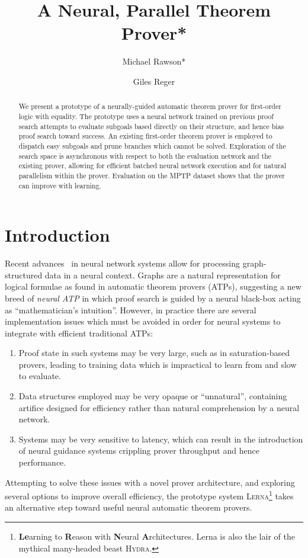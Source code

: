 \documentclass[runningheads]{llncs}
\newcommand{\lerna}{\textsc{Lerna}}
\begin{document}
\title{A Neural, Parallel Theorem Prover*}
\author{
	Michael Rawson* \and
	Giles Reger
}
\maketitle

\begin{abstract}
	We present a prototype of a neurally-guided automatic theorem prover for first-order logic with equality.
	The prototype uses a neural network trained on previous proof search attempts to evaluate subgoals based directly on their structure, and hence bias proof search toward success.
	An existing first-order theorem prover is employed to dispatch easy subgoals and prune branches which cannot be solved.
	Exploration of the search space is asynchronous with respect to both the evaluation network and the existing prover, allowing for efficient batched neural network execution and for natural parallelism within the prover.
	Evaluation on the MPTP dataset shows that the prover can improve with learning.
\end{abstract}

\section{Introduction}
Recent advances~ in neural network systems allow for processing graph-structured data in a neural context.
Graphs are a natural representation for logical formulae as found in automatic theorem provers (ATPs), suggesting a new breed of \emph{neural ATP} in which proof search is guided by a neural black-box acting as ``mathematician's intuition''.
However, in practice there are several implementation issues which must be avoided in order for neural systems to integrate with efficient traditional ATPs:
\begin{enumerate}
	\item Proof state in such systems may be very large, such as in saturation-based provers, leading to training data which is impractical to learn from and slow to evaluate.
	\item Data structures employed may be very opaque or ``unnatural'', containing artifice designed for efficiency rather than natural comprehension by a neural network.
	\item Systems may be very sensitive to latency, which can result in the introduction of neural guidance systems crippling prover throughput and hence performance.
\end{enumerate}
%
Attempting to solve these issues with a novel prover architecture, and exploring several options to improve overall efficiency, the prototype system \lerna{}\footnote{\textbf{Le}arning to \textbf{R}eason with \textbf{N}eural \textbf{A}rchitectures. Lerna is also the lair of the mythical many-headed beast \textsc{Hydra}.} takes an alternative step toward useful neural automatic theorem provers.
\end{document}
